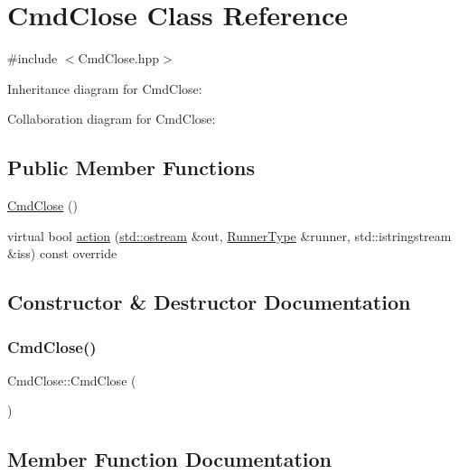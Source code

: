 \hypertarget{classCmdClose}{}\section{Cmd\+Close Class Reference}
\label{classCmdClose}


{\ttfamily \#include $<$Cmd\+Close.\+hpp$>$}



Inheritance diagram for Cmd\+Close\+:


Collaboration diagram for Cmd\+Close\+:
\subsection*{Public Member Functions}
\begin{DoxyCompactItemize}
\item 
\hyperlink{classCmdClose_ae4003b40d3f345043c36cd06654d1b37}{Cmd\+Close} ()
\item 
virtual bool \hyperlink{classCmdClose_a012e10635d377e533acfadf05e034654}{action} (\hyperlink{doctest_8h_a116af65cb5e924b33ad9d9ecd7a783f3}{std\+::ostream} \&out, \hyperlink{Command_8hpp_ad45c3de597c2023a8be0399d914161f4}{Runner\+Type} \&runner, std\+::istringstream \&iss) const override
\end{DoxyCompactItemize}


\subsection{Constructor \& Destructor Documentation}
\mbox{\label{classCmdClose_ae4003b40d3f345043c36cd06654d1b37}} 
\subsubsection{\texorpdfstring{Cmd\+Close()}{CmdClose()}}
{\footnotesize\ttfamily Cmd\+Close\+::\+Cmd\+Close (\begin{DoxyParamCaption}{ }\end{DoxyParamCaption})}



\subsection{Member Function Documentation}
\mbox{\label{classCmdClose_a012e10635d377e533acfadf05e034654}} 
